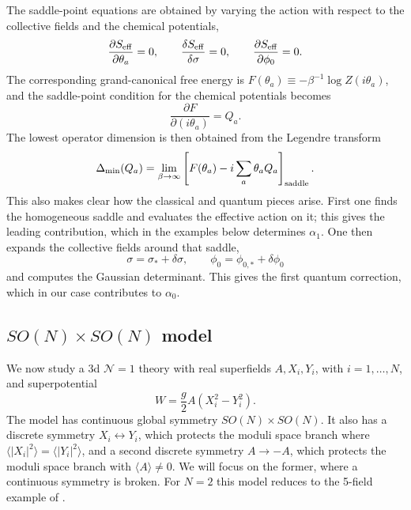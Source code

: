 \documentclass[a4paper,11pt]{article}
\newcommand\Dm{\Delta_{\min}}
\begin{document}
The saddle-point equations are obtained by varying the action with respect to the collective fields and the chemical potentials,
\begin{equation}
    \frac{\partial S_{\rm eff}}{\partial \theta_a}=0,
    \qquad
    \frac{\delta S_{\rm eff}}{\delta \sigma}=0,
    \qquad
    \frac{\partial S_{\rm eff}}{\partial \phi_0}=0.
\end{equation}
The corresponding grand-canonical free energy is
$F(\theta_a)\equiv-\beta^{-1}\log Z(i\theta_a)$, and the saddle-point condition for the chemical potentials becomes
\begin{equation}
  \frac{\partial F}{\partial(i\theta_a)}=Q_a.
\end{equation}
The lowest operator dimension is then obtained from the Legendre transform
\begin{equation}
  \Dm(Q_a) = \lim_{\beta\to\infty}\left[F(\theta_a)-i\sum_a\theta_aQ_a\right]_{\rm saddle}.
\end{equation}
This also makes clear how the classical and quantum pieces arise. First one finds the homogeneous saddle and evaluates the effective action on it; this gives the leading contribution, which in the examples below determines $\alpha_1$. One then expands the collective fields around that saddle,
\begin{equation}
  \sigma=\sigma_*+\delta\sigma, \qquad \phi_0=\phi_{0,*}+\delta\phi_0
\end{equation}
and computes the Gaussian determinant. This gives the first quantum correction, which in our case contributes to $\alpha_0$. 

\subsection{$SO(N)\times SO(N)$ model}\label{sec:SO(N)SO(N)_epsilon}

We now study a 3d $\mathcal{N}=1$ theory with real superfields $A,X_i,Y_i$, with $i=1,\ldots,N$, and superpotential
\begin{equation}\label{eq:SON_model_W}
  W=\frac{g}{2}A\left(X_{i}^{2}-Y_{i}^{2}\right).
\end{equation}
The model has continuous global symmetry $SO(N)\times SO(N)$. It also has a discrete symmetry $X_i\leftrightarrow Y_i$, which protects the moduli space branch where $\langle |X_i|^2\rangle=\langle |Y_i|^2\rangle$, and a second discrete symmetry $A\to -A$, which protects the moduli space branch with $\langle A\rangle\neq 0$. We will focus on the former, where a continuous symmetry is broken. For $N=2$ this model reduces to the 5-field example of \cite{Cuomo:2024fuy}.
\end{document}
